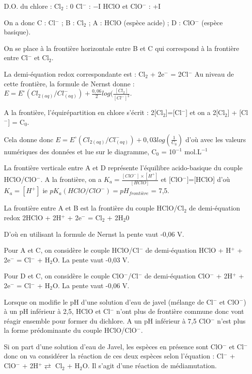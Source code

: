 \begin{solution}

\begin{questions}
\question 
D.O. du chlore : 
Cl$_2$ : 0
Cl$^-$ : $-$I
HClO et ClO$^-$ : +I

On a donc C : Cl$^-$ ; B : Cl$_2$ ; A : HClO (espèce acide) ; D : ClO$^-$ (espèce basique).


\question  On se place à la frontière horizontale entre B et C qui correspond à la frontière entre Cl$^-$ et Cl$_2$.

La demi-équation redox correspondante est : Cl$_2$ + 2e$^-$ = 2Cl$^-$
Au niveau de cette frontière, la formule de Nernst donne : 
$E = E^\circ(Cl_{2(aq)}/Cl^-_{(aq)}) + \frac{0,06}{2}log(\frac{[Cl_2]}{[Cl^-]^2}$. 

A la frontière, l'équirépartition en chlore s'écrit : 2[Cl$_2$]=[Cl$^-$] et on a 2[Cl$_2$] + [Cl$^-$] = C$_0$.

Cela donne donc $E = E^\circ(Cl_{2(aq)}/Cl^-_{(aq)}) + 0,03log(\frac{1}{C_0})$ d'où avec les valeurs numériques des données et lue sur le diagramme, C$_0$ = 10$^{-1}$ mol.L$^{-1}$

La frontière verticale entre A et D représente l'équilibre acido-basique du couple HClO/ClO$^-$. A la frontière, on a $K_a=\frac{[ClO^-]\times[H^+]}{[HClO]}$ et [ClO$^-$]=[HClO] d'où $K_a= [H^+] $ ie $pK_a(HClO/ClO^-) = pH_{frontière}$ = 7,5.

\question La frontière entre A et B est la frontière du couple HClO/Cl$_2$ de demi-équation redox 2HClO + 2H$^+$ + 2e$^-$ = Cl$_2$ + 2H$_2$0

D'où en utilisant la formule de Nernst la pente vaut -0,06 V.

Pour A et C, on considère le couple HClO/Cl$^-$ de demi-équation HClO + H$^+$ + 2e$^-$ = Cl$^-$ + H$_2$O. La pente vaut -0,03 V.

Pour D et C, on considère le couple ClO$^-$/Cl$^-$ de demi-équation ClO$^-$ + 2H$^+$ + 2e$^-$ = Cl$^-$ + H$_2$O. La pente vaut -0,06 V.


\question Lorsque on modifie le pH d'une solution d'eau de javel (mélange de Cl$^-$ et ClO$^-$) à un pH inférieur à 2,5, HClO et Cl$^-$ n'ont plus de frontière commune donc vont réagir ensemble pour former du dichlore. A un pH inférieur à 7,5 ClO$^-$ n'est plus la forme prédominante du couple HClO/ClO$^-$.

\question Si on part d'une solution d'eau de Javel, les espèces en présence sont ClO$^-$ et Cl$^-$ donc on va considérer la réaction de ces deux espèces selon l'équation : Cl$^-$ + ClO$^-$ + 2H$^+ \rightleftarrows$ Cl$_2$ + H$_2$O. Il s'agit d'une réaction de médiamutation. 


\end{questions}
\end{solution}
